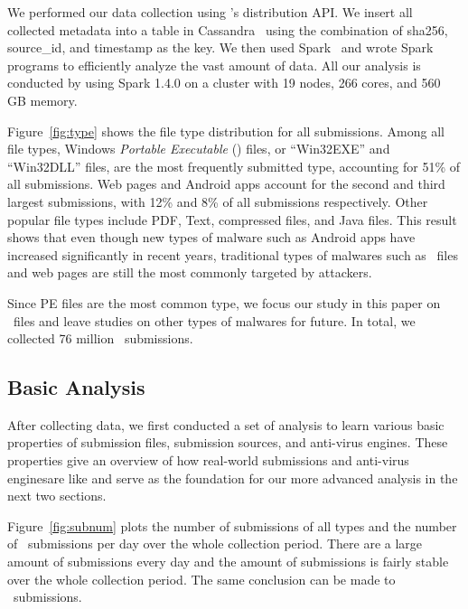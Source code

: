 We performed our data collection using \vt{}’s distribution API.
We insert all collected metadata into a table in Cassandra~\cite{cassandra} 
using the combination of sha256, source\_id, and timestamp as the key.
We then used Spark~\cite{spark} and wrote Spark programs to efficiently analyze the vast amount of data.
All our analysis is conducted by using Spark 1.4.0 on a cluster with 19 nodes, 266 cores, and 560 GB memory. 



Figure~\ref{fig:type} shows the file type distribution for all submissions. 
Among all file types, Windows \textit{Portable Executable} ({\em \pe}) files, or ``Win32EXE'' and ``Win32DLL'' files, 
are the most frequently submitted type,
accounting for 51\% of all submissions.
Web pages and Android apps account for the second and third largest submissions, 
with 12\% and 8\% of all submissions respectively. 
Other popular file types include PDF, Text, compressed files, and Java files. 
This result shows that even though new types of malware such as Android apps have
increased significantly in recent years, 
traditional types of malwares such as \pe\ files and web pages are still the 
most commonly targeted by attackers.

Since PE files are the most common type,
we focus our study in this paper on \pe\ files 
and leave studies on other types of malwares for future. 
In total, we collected 76 million \pe\ submissions.

\subsection{Basic Analysis}
After collecting data, we first conducted a set of analysis 
to learn various basic properties of submission files, 
submission sources, and anti-virus engines.
These properties give an overview of how real-world submissions and anti-virus enginesare like
and serve as the foundation for our more advanced analysis in the next two sections. 





Figure~\ref{fig:subnum} plots the number of submissions of all types and the number of \pe\ submissions per day 
over the whole collection period.
There are a large amount of submissions every day
and the amount of submissions is fairly stable over the whole collection period.
The same conclusion can be made to \pe\ submissions.

